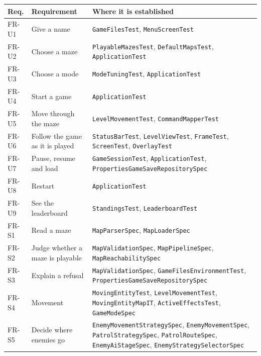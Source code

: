 \begin{center}
  \small
  \begin{tabular}{|p{1.6cm}|p{4.4cm}|p{6.4cm}|}
    \hline
    \textbf{Req.} & \textbf{Requirement} & \textbf{Where it is established} \\
    \hline
    FR-U1 & Give a name & \texttt{GameFilesTest}, \texttt{MenuScreenTest} \\
    \hline
    FR-U2 & Choose a maze & \texttt{PlayableMazesTest}, \texttt{DefaultMapsTest}, \texttt{ApplicationTest} \\
    \hline
    FR-U3 & Choose a mode & \texttt{ModeTuningTest}, \texttt{ApplicationTest} \\
    \hline
    FR-U4 & Start a game & \texttt{ApplicationTest} \\
    \hline
    FR-U5 & Move through the maze & \texttt{LevelMovementTest}, \texttt{CommandMapperTest} \\
    \hline
    FR-U6 & Follow the game as it is played & \texttt{StatusBarTest}, \texttt{LevelViewTest}, \texttt{FrameTest},
    \texttt{ScreenTest}, \texttt{OverlayTest} \\
    \hline
    FR-U7 & Pause, resume and load & \texttt{GameSessionTest}, \texttt{ApplicationTest},
    \texttt{PropertiesGameSaveRepositorySpec} \\
    \hline
    FR-U8 & Restart & \texttt{ApplicationTest} \\
    \hline
    FR-U9 & See the leaderboard & \texttt{StandingsTest}, \texttt{LeaderboardTest} \\
    \hline
    FR-S1 & Read a maze & \texttt{MapParserSpec}, \texttt{MapLoaderSpec} \\
    \hline
    FR-S2 & Judge whether a maze is playable & \texttt{MapValidationSpec}, \texttt{MapPipelineSpec},
    \texttt{MapReachabilitySpec} \\
    \hline
    FR-S3 & Explain a refusal & \texttt{MapValidationSpec}, \texttt{GameFilesEnvironmentTest},
    \texttt{PropertiesGameSaveRepositorySpec} \\
    \hline
    FR-S4 & Movement & \texttt{MovingEntityTest}, \texttt{LevelMovementTest}, \texttt{MovingEntityMapIT},
    \texttt{ActiveEffectsTest}, \texttt{GameModeSpec} \\
    \hline
    FR-S5 & Decide where enemies go & \texttt{EnemyMovementStrategySpec}, \texttt{EnemyMovementSpec},
    \texttt{PatrolStrategySpec}, \texttt{PatrolRouteSpec}, \texttt{EnemyAiStageSpec},
    \texttt{EnemyStrategySelectorSpec} \\

\end{tabular}
\end{center}
